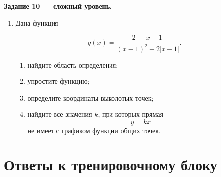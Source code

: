 \documentclass[a4paper,12pt]{article}
\begin{document}
\vspace{0.5em}
\textcolor{darkaccent}{\textbf{Задание 10 --- сложный уровень.}}

\begin{enumerate}[resume]

\item
Дана функция

\[
q(x)=
\frac{2-|x-1|}
{(x-1)^2-2|x-1|}.
\]

\begin{enumerate}[label=\alph*)]
\item найдите область определения;
\item упростите функцию;
\item определите координаты выколотых точек;
\item найдите все значения \(k\), при которых прямая
\[
y=kx
\]
не имеет с графиком функции общих точек.
\end{enumerate}

\end{enumerate}

\clearpage
\section*{Ответы к тренировочному блоку}

\renewcommand{\arraystretch}{1.45}
\end{document}
